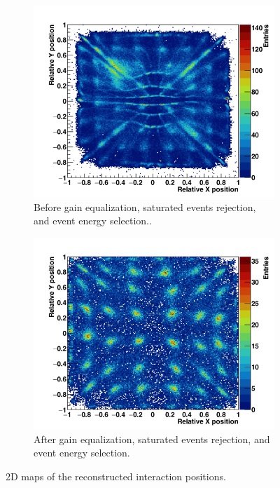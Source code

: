 \begin{figure} [!h]
\begin{subfigure}[t]{0.5\textwidth}
\centering
\includegraphics[width=1\textwidth]{03_GraphicFiles//chapter6_BeamTests/Nice_September2018/287_noSel/raw_2dMap.png}
\caption{Before gain equalization, saturated events rejection, and event energy selection..}
\label{chap6::fig::absraw_floodMap}
\end{subfigure}
\begin{subfigure}[t]{0.5\textwidth}
\centering
\includegraphics[width=1\textwidth]{03_GraphicFiles//chapter6_BeamTests/Nice_September2018/287_noSel/2_flood_canvas.png}
\caption{After gain equalization, saturated events rejection, and event energy selection.}
\label{chap6::fig::abscal_floodMap}
\end{subfigure}
\caption{2D maps of the reconstructed interaction positions.}
\label{chap6::fig::absFloodMap}
\end{figure}

